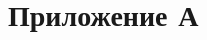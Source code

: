 \section*{Приложение А}
\label{sec:Appendix_1} 
\large

\begin{figure}[ht]
\centering 
\end{figure}

\begin{figure}[H]
\centering
\end{figure}
